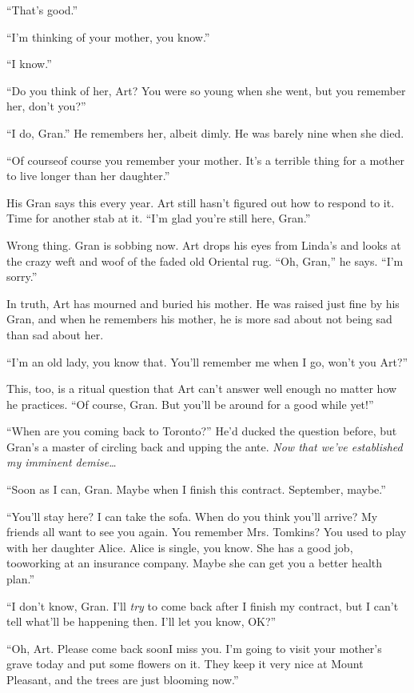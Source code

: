 “That’s good.”

“I’m thinking of your mother, you know.”

“I know.”

“Do you think of her, Art? You were so young when she went, but you
remember her, don’t you?”

“I do, Gran.” He remembers her, albeit dimly. He was barely nine
when she died.

“Of course{\dash}of course you remember your mother. It’s a terrible
thing for a mother to live longer than her daughter.”

His Gran says this every year. Art still hasn’t figured out how to
respond to it. Time for another stab at it. “I’m glad you’re still
here, Gran.”

Wrong thing. Gran is sobbing now. Art drops his eyes from Linda’s
and looks at the crazy weft and woof of the faded old Oriental rug.
“Oh, Gran,” he says. “I’m sorry.”

In truth, Art has mourned and buried his mother. He was raised just
fine by his Gran, and when he remembers his mother, he is more sad
about not being sad than sad about her.

“I’m an old lady, you know that. You’ll remember me when I go,
won’t you Art?”

This, too, is a ritual question that Art can’t answer well enough
no matter how he practices. “Of course, Gran. But you’ll be around
for a good while yet!”

“When are you coming back to Toronto?” He’d ducked the question
before, but Gran’s a master of circling back and upping the ante.
\emph{Now that we’ve established my imminent demise\ldots{}}

“Soon as I can, Gran. Maybe when I finish this contract. September,
maybe.”

“You’ll stay here? I can take the sofa. When do you think you’ll
arrive? My friends all want to see you again. You remember Mrs.
Tomkins? You used to play with her daughter Alice. Alice is single,
you know. She has a good job, too{\dash}working at an insurance company.
Maybe she can get you a better health plan.”

“I don’t know, Gran. I’ll \emph{try} to come back after I finish my
contract, but I can’t tell what’ll be happening then. I’ll let you
know, OK?”

“Oh, Art. Please come back soon{\dash}I miss you. I’m going to visit your
mother’s grave today and put some flowers on it. They keep it very
nice at Mount Pleasant, and the trees are just blooming now.”

